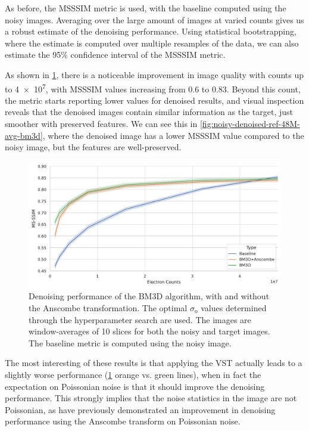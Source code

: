 As before, the \gls{MSSSIM} metric is used, with the baseline computed using the noisy images. Averaging over the large amount of images at varied counts gives us a robust estimate of the denoising performance. Using statistical bootstrapping, where the estimate is computed over multiple resamples of the data, we can also estimate the 95\% confidence interval of the \gls{MSSSIM} metric.

As shown in \cref{fig:bm3d-msssim}, there is a noticeable improvement in image quality with counts up to \num{4e7}, with \gls{MSSSIM} values increasing from \num{0.6} to \num{0.83}. Beyond this count, the metric starts reporting lower values for denoised results, and visual inspection reveals that the denoised images contain similar information as the target, just smoother with preserved features. We can see this in \cref{fig:noisy-denoised-ref-48M-avg-bm3d}, where the denoised image has a lower \gls{MSSSIM} value compared to the noisy image, but the features are well-preserved.

\begin{figure}
    \centering
    \includegraphics[width=1\linewidth]{images/bm3d_msssim.pdf}
    \caption{Denoising performance of the \gls{BM3D} algorithm, with and without the Anscombe transformation. The optimal $\sigma_{\text{o}}$ values determined through the hyperparameter search are used. The images are window-averages of 10 slices for both the noisy and target images. The baseline metric is computed using the noisy image.}
    \label{fig:bm3d-msssim}
\end{figure}


The most interesting of these results is that applying the \gls{VST} actually leads to a slightly worse performance (\cref{fig:bm3d-msssim} orange vs. green lines), when in fact the expectation on Poissonian noise is that it should improve the denoising performance. This strongly implies that the noise statistics in the image are not Poissonian, as \citeauthor{makitaloOptimalInversionAnscombe2011} have previously demonstrated an improvement in denoising performance using the Anscombe transform on Poissonian noise.
